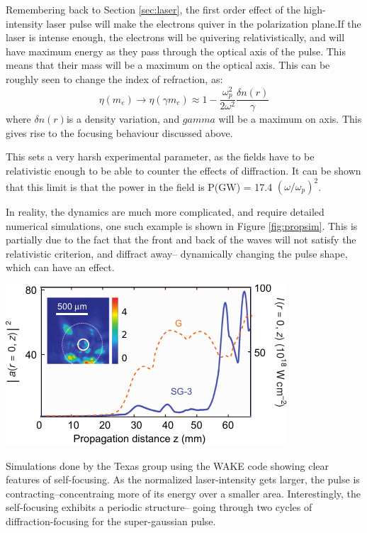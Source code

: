 \documentclass[12pt,letter]{article}
\begin{document}
Remembering back to Section \ref{sec:laser}, the first order effect of the
high-intensity laser pulse will make the electrons quiver in the polarization
plane.If the laser is intense enough, the electrons will be quivering
relativistically, and will have maximum energy as they pass through the optical
axis of the pulse. This means that their mass will be a maximum on the optical
axis. This can be roughly seen to change the index of refraction, as:
\begin{equation}
    \label{eq:indexrel}
    \eta(m_e) \rightarrow \eta(\gamma m_e) \approx
1-\frac{\omega_p^2}{2\omega^2}\frac{\delta n(r)}{\gamma}
\end{equation}
where $\delta n(r) $is a density variation, and $gamma$ will be a maximum on
axis.\cite{esarey} This gives rise to the focusing behaviour
discussed above.

This sets a very harsh experimental parameter, as the fields have to be
relativistic enough to be able to counter the effects of diffraction. It can be
shown that this limit is that the power in the field is P(GW) = 17.4
$(\omega/\omega_p)^2$\cite{esarey}.

In reality, the dynamics are much more complicated, and require detailed
numerical simulations, one such example is shown in Figure
\ref{fig:propsim}\cite{Wang2013}. This is partially due to the fact that the
front and back of the waves will not satisfy the relativistic criterion, and
diffract away-- dynamically changing the pulse shape, which can have an effect.
\begin{marginfigure}
	\includegraphics[width=\marginparwidth]{../figures/wakesimulation.pdf}
    \caption{Simulations done by the Texas group using the WAKE
        code showing clear features of self-focusing.\cite{Wang2013} As the
        normalized laser-intensity gets larger, the pulse is
        contracting--concentraing more of its energy over a smaller area.
        Interestingly, the self-focusing exhibits a periodic structure-- going
        through two cycles of diffraction-focusing for the super-gaussian
    pulse.\label{fig:propsim}}
\end{marginfigure}
\end{document}
